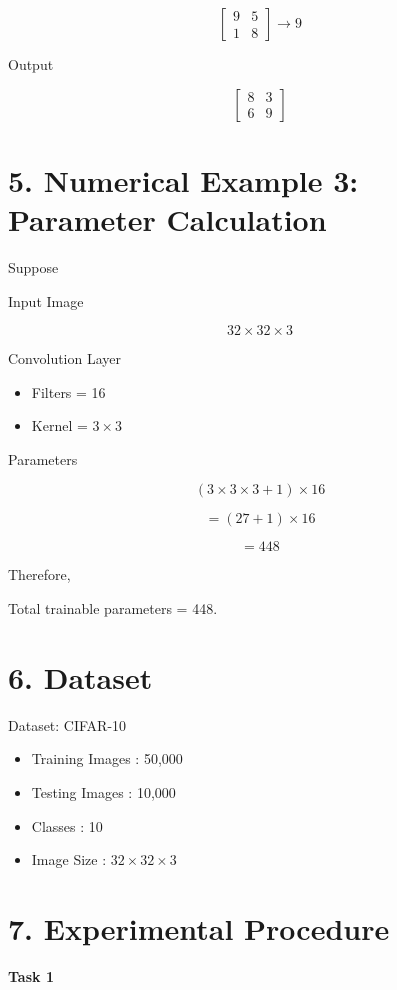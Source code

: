 \documentclass[11pt]{article}
\begin{document}
\[
\begin{bmatrix}
9&5\\
1&8
\end{bmatrix}
\rightarrow9
\]

Output

\[
\begin{bmatrix}
8&3\\
6&9
\end{bmatrix}
\]

\section*{5. Numerical Example 3: Parameter Calculation}

Suppose

Input Image

\[
32\times32\times3
\]

Convolution Layer

\begin{itemize}
\item Filters = 16
\item Kernel = $3\times3$
\end{itemize}

Parameters

\[
(3\times3\times3+1)\times16
\]

\[
=(27+1)\times16
\]

\[
=448
\]

Therefore,

Total trainable parameters = 448.

\section*{6. Dataset}

Dataset: CIFAR-10

\begin{itemize}
\item Training Images : 50,000
\item Testing Images : 10,000
\item Classes : 10
\item Image Size : $32\times32\times3$
\end{itemize}

\section*{7. Experimental Procedure}

\textbf{Task 1}
\end{document}
